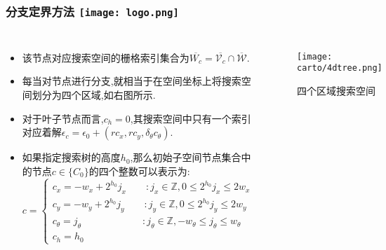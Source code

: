 \begin{comment}
\end{comment}
\begin{frame}
\frametitle{分支定界方法 \hfill \texttt{[image: logo.png]}}

\begin{columns}
	
	\begin{itemize}
		\item 该节点对应搜索空间的栅格索引集合为$\overline{W_c} = \overline{\mathcal{V}_c} \cap \overline{\mathcal{W}}$.
		\item 每当对节点进行分支,就相当于在空间坐标上将搜索空间划分为四个区域,如右图所示.
		\item 对于叶子节点而言,$c_h = 0$,其搜索空间中只有一个索引对应着解$\epsilon_c = \epsilon_0+(rc_x, rc_y, \delta_\theta c_\theta)$.
		\item 如果指定搜索树的高度$h_0$,那么初始子空间节点集合中的节点$c \in \{C_0\}$的四个整数可以表示为:
		\vspace{0.2cm}
		\begin{equation}
			c = 
			\begin{cases}
			c_x = -w_x + 2^{h_0}j_x \qquad : j_x \in \mathbb{Z}, 0 \leq 2^{h_0}j_x \leq 2w_x \\
			c_y = -w_y + 2^{h_0}j_y \qquad : j_y \in \mathbb{Z}, 0 \leq 2^{h_0}j_y \leq 2w_y \\
			c_\theta = j_\theta \qquad\qquad\qquad\ : j_\theta \in \mathbb{Z}, -w_\theta \leq j_\theta \leq w_\theta \\
			c_h = h_0 \
			\end{cases}
		\end{equation}
	\end{itemize}
	
	\begin{figure}[h]
		\texttt{[image: carto/4dtree.png]}
		\caption{四个区域搜索空间}
	\end{figure}
\end{columns}

\end{frame}

